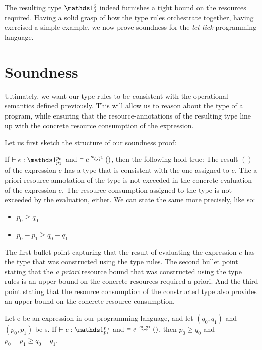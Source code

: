 The resulting type \(\ratype{\unit}{6}{0}\) indeed furnishes a tight bound on the resources required. Having a solid grasp of how the type rules orchestrate together, having exercised a simple example, we now prove soundness for the \emph{let-tick} programming language.


\section{Soundness}
Ultimately, we want our type rules to be consistent with the operational semantics defined previously. This will allow us to reason about the type of a program, while ensuring that the resource-annotations of the resulting type line up with the concrete resource consumption of the expression.

Let us first sketch the structure of our soundness proof:

If \(\typing{}{e}{\ratype{\unit}{p_0}{p_1}}\) and \(\evals{}{e}{()}{q_0}{q_1}\), then the following hold true:
The result \(()\) of the expression \(e\) has a type that is consistent with the one assigned to \(e\). The a priori resource annotation of the type is not exceeded in the concrete evaluation of the expression \(e\). The resource consumption assigned to the type is not exceeded by the evaluation, either. We can state the same more precisely, like so: 

\begin{itemize}
   \item \(p_0 \geq q_0\)     
   \item \(p_0 - p_1 \geq q_0 - q_1\)
\end{itemize}

The first bullet point capturing that the result of evaluating the expression \(e\) has the type that was constructed using the type rules. The second bullet point stating that the \emph{a priori} resource bound that was constructed using the type rules is an upper bound on the concrete resources required a priori. And the third point stating that the resource consumption of the constructed type also provides an upper bound on the concrete resource consumption.

\begin{theorem}
   Let e be an expression in our programming language, and let \((q_0, q_1)\) and \((p_0, p_1)\) be s. If \(\typing{}{e}{\ratype{\unit}{p_0}{p_1}}\) and \(\evals{}{e}{()}{q_0}{q_1}\), then \(p_0 \geq q_0\) and \(p_0 - p_1 \geq q_0 - q_1\).
\end{theorem}

